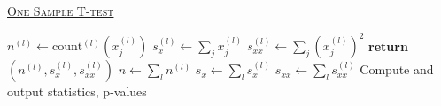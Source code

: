 \documentclass[10pt]{article}
\begin{document}
\begin{algorithm}
        \caption{\underline{\textsc{One Sample T-test }}}
        \label{naivebayes_train}
        \begin{algorithmic}[1] %
                 
					\State $n^{(l)} \gets \text{count}^{(l)}(x_j^{(l)})$
                    \State $s_x^{(l)} \gets \sum_j x_j^{(l)}$
                    \State $s_{xx}^{(l)} \gets \sum_j {(x_j^{(l)})^2}$
                    \State \textbf{return} $(n^{(l)}, s_x^{(l)}, s_{xx}^{(l)})$
                \EndProcedure
                     \State $n \gets \sum_l n^{(l)}$
                     \State $s_x \gets \sum_l s_x^{(l)}$
                     \State $s_{xx} \gets \sum_l s_{xx}^{(l)}$
                     \State Compute and output statistics, p-values
                \EndProcedure
        \end{algorithmic}
\end{algorithm}
\end{document}
